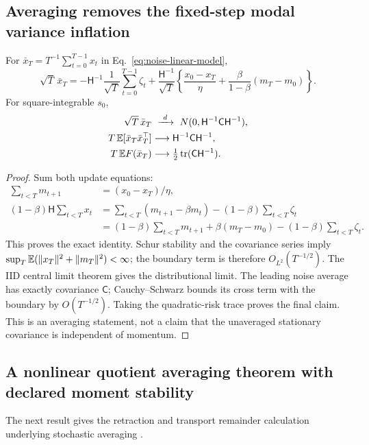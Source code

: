 \subsection{Averaging removes the fixed-step modal variance inflation}
\begin{theorem}
\label{thm:noise-average-boundary}
For $\bar x_T=T^{-1}\sum_{t=0}^{T-1}x_t$ in
Eq.~\eqref{eq:noise-linear-model},
\begin{equation}
\sqrt T\,\bar x_T
=-\mathsf H^{-1}\frac1{\sqrt T}\sum_{t=0}^{T-1}\zeta_t
+\frac{\mathsf H^{-1}}{\sqrt T}
\left\{\frac{x_0-x_T}{\eta}
+\frac{\beta}{1-\beta}(m_T-m_0)\right\}.
\label{eq:noise-average-boundary}
\end{equation}
For square-integrable $s_0$,
\begin{align}
\sqrt T\,\bar x_T
&\ \xrightarrow{\ d\ }\ 
N(0,\mathsf H^{-1}\mathsf C\mathsf H^{-1}),\\
T\,\E[\bar x_T\bar x_T^\top]
&\longrightarrow\mathsf H^{-1}\mathsf C\mathsf H^{-1},\\
T\,\E F(\bar x_T)&\longrightarrow
\tfrac12\operatorname{tr}(\mathsf C\mathsf H^{-1}).
\label{eq:noise-average-covariance}
\end{align}
\end{theorem}
\begin{proof}
Sum both update equations:
\begin{align}
\sum_{t<T}m_{t+1}&=(x_0-x_T)/\eta,\\
(1-\beta)\mathsf H\sum_{t<T}x_t
&=\sum_{t<T}(m_{t+1}-\beta m_t)
-(1-\beta)\sum_{t<T}\zeta_t\\
&=(1-\beta)\sum_{t<T}m_{t+1}
+\beta(m_T-m_0)-(1-\beta)\sum_{t<T}\zeta_t .
\end{align}
This proves the exact identity.
Schur stability and the covariance series imply
$\sup_T\mathbb E(\|x_T\|^2+\|m_T\|^2)<\infty$; the boundary term is
therefore $O_{L^2}(T^{-1/2})$.
The IID central limit theorem gives the distributional limit.
The leading noise average has exactly covariance $\mathsf C$;
Cauchy--Schwarz bounds its cross term with the boundary by
$O(T^{-1/2})$. Taking the quadratic-risk trace proves the final claim.
This is an averaging statement, not a claim that the unaveraged
stationary covariance is independent of momentum.
\end{proof}

\subsection{A nonlinear quotient averaging theorem with declared moment stability}
The next result gives the retraction and transport remainder
calculation underlying stochastic averaging
\cite{polyak1992averaging}.

